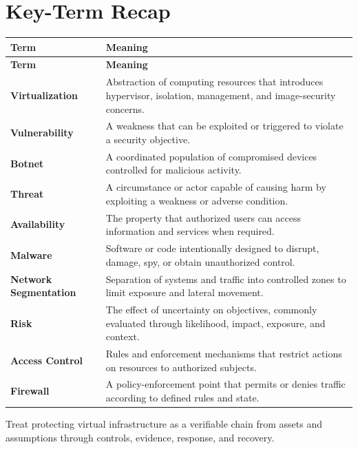 \documentclass[11pt]{article}
\begin{document}
\section*{Key-Term Recap}
\begin{longtable}{>{\RaggedRight\arraybackslash}p{}>{\RaggedRight\arraybackslash}p{}}
\toprule\rowcolor{Navy}\color{white}\textbf{Term} & \color{white}\textbf{Meaning}\\\midrule
\endfirsthead
\toprule\rowcolor{Navy}\color{white}\textbf{Term} & \color{white}\textbf{Meaning}\\\midrule
\endhead
\textbf{Virtualization} & Abstraction of computing resources that introduces hypervisor, isolation, management, and image-security concerns. \\\midrule
\textbf{Vulnerability} & A weakness that can be exploited or triggered to violate a security objective. \\\midrule
\textbf{Botnet} & A coordinated population of compromised devices controlled for malicious activity. \\\midrule
\textbf{Threat} & A circumstance or actor capable of causing harm by exploiting a weakness or adverse condition. \\\midrule
\textbf{Availability} & The property that authorized users can access information and services when required. \\\midrule
\textbf{Malware} & Software or code intentionally designed to disrupt, damage, spy, or obtain unauthorized control. \\\midrule
\textbf{Network Segmentation} & Separation of systems and traffic into controlled zones to limit exposure and lateral movement. \\\midrule
\textbf{Risk} & The effect of uncertainty on objectives, commonly evaluated through likelihood, impact, exposure, and context. \\\midrule
\textbf{Access Control} & Rules and enforcement mechanisms that restrict actions on resources to authorized subjects. \\\midrule
\textbf{Firewall} & A policy-enforcement point that permits or denies traffic according to defined rules and state. \\\midrule
\bottomrule
\end{longtable}
\begin{takeawaybox}
Treat protecting virtual infrastructure as a verifiable chain from assets and assumptions through controls, evidence, response, and recovery.
\end{takeawaybox}
\end{document}
